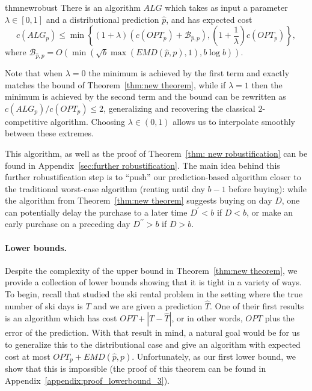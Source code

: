 \begin{restatable}{thm}{newrobust}
    \label{thm: new robustification}
    There is an algorithm $ALG$ which takes as input a parameter $\lambda \in [0,1]$ and a distributional prediction $\hat p$, and has expected cost
    \[c(ALG_p) \leq \min \left\{ (1+\lambda)\left(c(OPT_p)+\mathcal{B}_{\hat{p}, p} \right) , \left(1+\frac{1}{\lambda}\right)c(OPT_p)\right\},\]
    where $\mathcal{B}_{\hat{p},p} = O\left( \min\left(   \sqrt{b} \max\left(EMD(\hat{p},p),1\right),  b \log b \right)\right)$.
\end{restatable}

Note that when $\lambda = 0$ the minimum is achieved by the first term and exactly matches the bound of Theorem~\ref{thm:new theorem}, while if $\lambda = 1$ then the minimum is achieved by the second term and the bound can be rewritten as $c(ALG_p) / c(OPT_p) \leq 2$, generalizing and recovering the classical $2$-competitive algorithm.  Choosing $\lambda \in (0,1)$ allows us to interpolate smoothly between these extremes.



This algorithm, as well as the proof of Theorem~\ref{thm: new robustification} can be found in Appendix~\ref{sec:further robustification}. 
The main idea behind this further robustification step is to ``push'' our prediction-based algorithm closer to the traditional worst-case algorithm (renting until day $b-1$ before buying): while the algorithm from Theorem~\ref{thm:new theorem} suggests buying on day $D$, one can potentially delay the purchase to a later time $D^\prime <b$ if $D<b$, or make an early purchase on a preceding day $D^{\prime \prime} >b$ if $D>b$. 


\paragraph{Lower bounds.}  

Despite the complexity of the upper bound in Theorem~\ref{thm:new theorem}, we provide a collection of lower bounds showing that it is tight in a variety of ways.  To begin, recall that \citet{kumar2024improvingonlinealgorithmsml} studied the ski rental problem in the setting where the true number of ski days is $T$ and we are given a prediction $\hat T$.  One of their first results is an algorithm which has cost $OPT + |T - \hat T|$, or in other words, $OPT$ plus the error of the prediction.  With that result in mind, a natural goal would be for us to generalize this to the distributional case and give an algorithm with expected cost at most $OPT_p + EMD(\hat p, p)$.  Unfortunately, as our first lower bound, we show that this is impossible (the proof of this theorem can be found in Appendix~\ref{appendix:proof_lowerbound_3}).  

